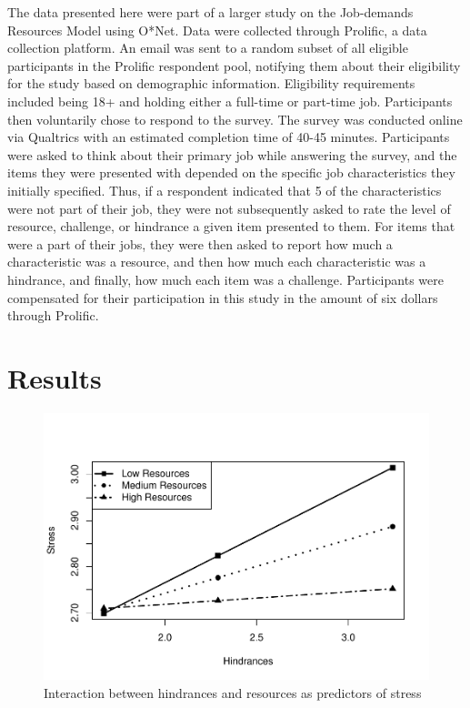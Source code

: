 \documentclass[
  english,
  man]{apa6}
\begin{document}
The data presented here were part of a larger study on the Job-demands Resources Model using O*Net. Data were collected through Prolific, a data collection platform. An email was sent to a random subset of all eligible participants in the Prolific respondent pool, notifying them about their eligibility for the study based on demographic information. Eligibility requirements included being 18+ and holding either a full-time or part-time job. Participants then voluntarily chose to respond to the survey. The survey was conducted online via Qualtrics with an estimated completion time of 40-45 minutes. Participants were asked to think about their primary job while answering the survey, and the items they were presented with depended on the specific job characteristics they initially specified. Thus, if a respondent indicated that 5 of the characteristics were not part of their job, they were not subsequently asked to rate the level of resource, challenge, or hindrance a given item presented to them. For items that were a part of their jobs, they were then asked to report how much a characteristic was a resource, and then how much each characteristic was a hindrance, and finally, how much each item was a challenge. Participants were compensated for their participation in this study in the amount of six dollars through Prolific.

\hypertarget{results}{%
\section{Results}\label{results}}

\begin{figure}
\centering
\includegraphics{SIOP_PROCESS_files/figure-latex/analyses-1.pdf}
\caption{\label{fig:analyses}Interaction between hindrances and resources as predictors of stress}
\end{figure}
\end{document}
